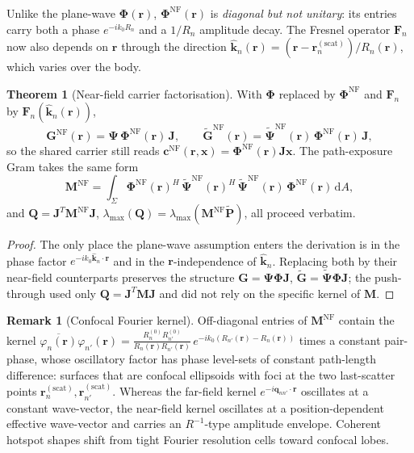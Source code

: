 \documentclass[11pt,a4paper]{article}
\theoremstyle{definition}
\newtheorem{theorem}{Theorem}[section]
\newtheorem{remark}[remark]{Remark}
\newcommand{\khat}{\hat{\bm{k}}}
\newcommand{\rr}{\mathbf{r}}
\newcommand{\diff}{\mathrm{d}}
\newcommand{\Jmat}{\mathbf{J}}                 %
\newcommand{\Phimat}{\mathbf{\Phi}}            %
\newcommand{\Psimat}{\bm{\Psi}}                %
\newcommand{\Psitil}{\tilde{\bm{\Psi}}}        %
\newcommand{\Mmat}{\mathbf{M}}                 %
\newcommand{\Qmat}{\mathbf{Q}}                 %
\newcommand{\Pmat}{\tilde{\mathbf{P}}}         %
\newcommand{\xx}{\mathbf{x}}
\newcommand{\cvec}{\mathbf{c}}
\newcommand{\Fn}{\mathbf{F}_n}
\newcommand{\GG}{\mathbf{G}}
\newcommand{\Gtil}{\tilde{\mathbf{G}}}
\newcommand{\Sigmabody}{\Sigma}
\begin{document}
Unlike the plane-wave $\Phimat(\rr)$, $\Phimat^{\mathrm{NF}}(\rr)$ is
\emph{diagonal but not unitary}: its entries carry both a phase
$e^{-ik_0 R_n}$ and a $1/R_n$ amplitude decay.  The Fresnel operator
$\Fn$ now also depends on $\rr$ through the direction
$\khat_n(\rr)=(\rr-\rr_n^{(\mathrm{scat})})/R_n(\rr)$, which varies over
the body.

\begin{theorem}[Near-field carrier factorisation]\label{thm:NF}
With $\Phimat$ replaced by $\Phimat^{\mathrm{NF}}$ and $\Fn$ by
$\Fn(\khat_n(\rr))$,
\begin{equation}\label{eq:NF-factor}
  \GG^{\mathrm{NF}}(\rr)=\Psimat\,\Phimat^{\mathrm{NF}}(\rr)\,\Jmat,
  \qquad
  \Gtil^{\mathrm{NF}}(\rr)=\Psitil^{\mathrm{NF}}(\rr)\,\Phimat^{\mathrm{NF}}(\rr)\,\Jmat,
\end{equation}
so the shared carrier still reads
$\cvec^{\mathrm{NF}}(\rr,\xx)=\Phimat^{\mathrm{NF}}(\rr)\Jmat\xx$.  The
path-exposure Gram takes the same form
\begin{equation}\label{eq:M-NF}
  \Mmat^{\mathrm{NF}}=\int_{\Sigmabody}
  \Phimat^{\mathrm{NF}}(\rr)^H\,\Psitil^{\mathrm{NF}}(\rr)^H\,
  \Psitil^{\mathrm{NF}}(\rr)\,\Phimat^{\mathrm{NF}}(\rr)\,\diff A,
\end{equation}
and $\Qmat=\Jmat^T\Mmat^{\mathrm{NF}}\Jmat$,
$\lambda_{\max}(\Qmat)=\lambda_{\max}(\Mmat^{\mathrm{NF}}\Pmat)$,
 all proceed verbatim.
\end{theorem}

\begin{proof}
The only place the plane-wave assumption enters the derivation is in the
phase factor $e^{-ik_0\khat_n\cdot\rr}$ and in the $\rr$-independence of
$\khat_n$.  Replacing both by their near-field counterparts preserves the
structure $\GG=\Psimat\Phimat\Jmat$, $\Gtil=\Psitil\Phimat\Jmat$; the
push-through  used only $\Qmat=\Jmat^T\Mmat\Jmat$ and
did not rely on the specific kernel of $\Mmat$.
\end{proof}

\begin{remark}[Confocal Fourier kernel]\label{rem:confocal}
Off-diagonal entries of $\Mmat^{\mathrm{NF}}$ contain the kernel
$\overline{\varphi_n(\rr)}\varphi_{n'}(\rr)
=\tfrac{R_n^{(0)}R_{n'}^{(0)}}{R_n(\rr)R_{n'}(\rr)}\,
e^{-ik_0(R_{n'}(\rr)-R_n(\rr))}$ times a constant pair-phase, whose
oscillatory factor has phase level-sets of constant path-length
difference: surfaces that are confocal ellipsoids with foci at the two
last-scatter points $\rr_n^{(\mathrm{scat})},\rr_{n'}^{(\mathrm{scat})}$.
Whereas the far-field kernel $e^{-i\mathbf q_{nn'}\cdot\rr}$ oscillates
at a constant wave-vector, the near-field kernel oscillates at a
position-dependent effective wave-vector and carries an $R^{-1}$-type
amplitude envelope.  Coherent hotspot shapes shift from tight Fourier
resolution cells toward confocal lobes.
\end{remark}
\end{document}
